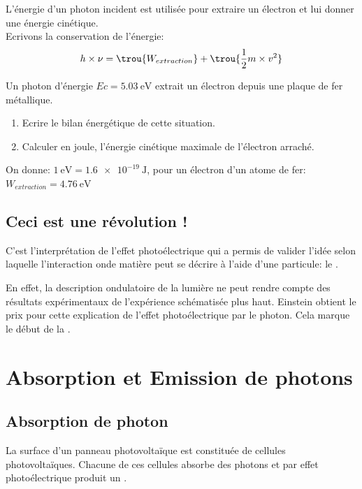 {
 L'énergie d'un photon incident est utilisée pour extraire un électron et lui donner une énergie cinétique.\\
 Ecrivons la conservation de l'énergie:
 $$h\times \nu =\trou{W_{extraction}} + \trou{\frac{1}{2}m\times v^2} $$
}


Un photon d'énergie $Ec=\SI{5.03}{\eV}$ extrait un électron depuis une plaque de fer métallique. 
\begin{enumerate}
	\item Ecrire le bilan énergétique de cette situation.
	\item Calculer en joule, l'énergie cinétique maximale de l'électron arraché.
\end{enumerate}
On donne: $\SI{1}{\eV}=\SI{1.6e-19}{\J}$, pour un électron d'un atome de fer: $W_{extraction}=\SI{4.76}{\eV}$

\vspace{7cm}
\subsection{Ceci est une révolution !}

C'est l'interprétation de l'effet photoélectrique qui a permis de valider l'idée  selon laquelle l'interaction onde matière peut se décrire à l'aide d'une particule: le . 

En effet, la description ondulatoire de la lumière ne peut rendre compte des résultats expérimentaux de l'expérience schématisée plus haut. Einstein obtient le prix  pour cette explication de l'effet photoélectrique par le photon. Cela marque le début de la .


\section{Absorption et Emission de photons}
\subsection{Absorption de photon}

La surface d'un panneau photovoltaïque est constituée de cellules photovoltaïques. Chacune de ces cellules absorbe des photons et par effet photoélectrique produit un .

